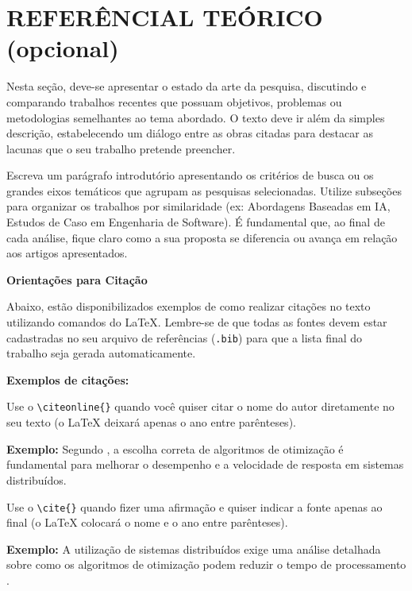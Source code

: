     
\section{REFERÊNCIAL TEÓRICO (opcional)} 
\label{sec:referencial-teorico}

Nesta seção, deve-se apresentar o estado da arte da pesquisa, discutindo e 
comparando trabalhos recentes que possuam objetivos, problemas ou metodologias 
semelhantes ao tema abordado. O texto deve ir além da simples descrição, 
estabelecendo um diálogo entre as obras citadas para destacar as lacunas 
que o seu trabalho pretende preencher.

Escreva um parágrafo introdutório apresentando os critérios de busca ou os 
grandes eixos temáticos que agrupam as pesquisas selecionadas. Utilize subseções 
para organizar os trabalhos por similaridade (ex: Abordagens Baseadas em IA, 
Estudos de Caso em Engenharia de Software). É fundamental que, ao final de cada 
análise, fique claro como a sua proposta se diferencia ou avança em relação aos
artigos apresentados.

\textbf{Orientações para Citação}

Abaixo, estão disponibilizados exemplos de como realizar citações no texto
utilizando comandos do LaTeX. Lembre-se de que todas as fontes devem estar
cadastradas no seu arquivo de referências (\texttt{.bib}) para que a lista
final do trabalho seja gerada automaticamente.

\textbf{Exemplos de citações:}

Use o \texttt{\textbackslash citeonline\{\}} quando você quiser citar o nome
do autor diretamente no seu texto (o LaTeX deixará apenas o ano entre parênteses).

\textbf{Exemplo:} Segundo , a escolha correta de algoritmos
de otimização é fundamental para melhorar o desempenho e a velocidade de
resposta em sistemas distribuídos.

Use o \texttt{\textbackslash cite\{\}} quando fizer uma afirmação e quiser
indicar a fonte apenas ao final (o LaTeX colocará o nome e o ano entre
parênteses).

\textbf{Exemplo:} A utilização de sistemas distribuídos exige uma análise
detalhada sobre como os algoritmos de otimização podem reduzir o tempo de
processamento \cite{almeida2022}.

